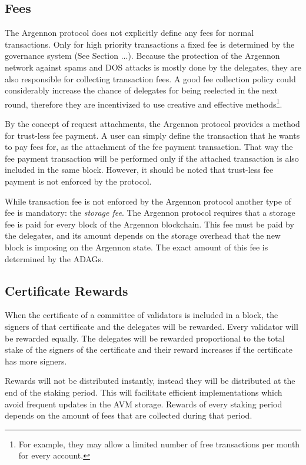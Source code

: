 
\subsection{Fees}\label{subsec:fees}

The Argennon protocol does not explicitly define any fees for normal transactions. Only for high priority
transactions a fixed fee is determined by the governance system (See Section ...). Because the protection of the
Argennon network against spams and DOS attacks is mostly done by the delegates, they are also responsible for
collecting transaction fees. A good fee collection policy could considerably increase the chance of delegates for
being reelected in the
next round, therefore they are incentivized to use creative and effective methods\footnote{For example, they may
allow a limited number of free transactions per month for every account.}.

By the concept of request attachments, the Argennon protocol provides a method
for trust-less fee payment. A user can simply define the transaction that he wants to pay fees for, as the attachment
of the fee payment transaction. That way the fee payment transaction will be performed only if the attached
transaction is also included in the same block. However, it should be noted that trust-less fee payment is not
enforced by the protocol.

While transaction fee is not enforced by the Argennon protocol another type of fee is mandatory: the
\emph{storage fee}. The Argennon protocol requires that a storage fee is paid for every block of the Argennon
blockchain. This fee must be paid by the delegates, and its amount depends on the storage overhead that the new block
is imposing on the Argennon state. The exact amount of this fee is determined by the ADAGs.

\subsection{Certificate Rewards}\label{subsec:rewards}

When the certificate of a committee of validators is included in a block, the signers of that certificate and the
delegates will be rewarded. Every validator will be rewarded equally. The delegates will be rewarded
proportional to the total stake of the signers of the certificate and their reward increases if the
certificate has more signers.

Rewards will not be distributed instantly, instead they will be distributed at the end of the staking period.
This will facilitate efficient implementations which avoid frequent updates in the AVM storage.
Rewards of every staking period depends on the amount of fees that are collected during that period.

